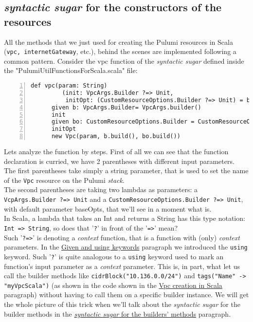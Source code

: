\subsection{\textit{syntactic sugar} for the constructors of the resources}
All the methods that we just used for creating the Pulumi resources in Scala (\texttt{vpc, internetGateway}, etc.), behind the scenes are implemented following a common pattern.
Consider the vpc function of the \textit{syntactic sugar} defined inside the "PulumiUtilFunctionsForScala.scala" file:\\
\begin{minipage}{\linewidth}
\begin{lstlisting}[numbers=left, numberstyle=\tiny, numbersep=-5pt, stepnumber=1]
  def vpc(param: String)
         (init: VpcArgs.Builder ?=> Unit,
          initOpt: (CustomResourceOptions.Builder ?=> Unit) = baseOpts): Vpc =
	  given b: VpcArgs.Builder= VpcArgs.builder()
	  init
	  given bo: CustomResourceOptions.Builder = CustomResourceOptions.builder()
	  initOpt
	  new Vpc(param, b.build(), bo.build())
\end{lstlisting}
\end{minipage}
Lets analyze the function by steps.
First of all we can see that the function declaration is curried, we have 2 parentheses with different input parameters.\\
The first parentheses take simply a string parameter, that is used to set the name of the \texttt{Vpc} resource on the Pulumi \textit{stack}.\\
The second parentheses are taking two lambdas as parameters: a \texttt{VcpArgs.Builder ?=> Unit}  and a \texttt{CustomResourceOptions.Builder ?=> Unit}, with default parameter baseOpts, that we'll see in a moment what is.\\
In Scala, a lambda that takes an Int and returns a String has this type notation: \texttt{Int => String}, so does that '\texttt{?}' in front of the '\texttt{=>}' mean?\\
Such '\texttt{?=>}' is denoting a \textit{context} function, that is a function with (only) \textit{context} parameters.
In the \hyperref[par:given-using]{Given and using keywords} paragraph we introduced the \texttt{using} keyword.
Such '\texttt{?}' is quite analogous to a \texttt{using} keyword used to mark an function's input parameter as a \textit{context} parameter.
This is, in part, what let us call the builder methods like \texttt{cidrBlock("10.136.0.0/24")} and \texttt{tags("Name" -> "myVpcScala")} (as shown in the code shown in the \hyperref[sssec:vpc-creation-scala]{Vpc creation in Scala} paragraph)
without having to call them on a specific builder instance.
We will get the whole picture of this trick when we'll talk about the \textit{syntactic sugar} for the builder methods in the \hyperref[ssec:syn-sug-builders]{\textit{syntactic sugar} for the builders' methods} paragraph.

